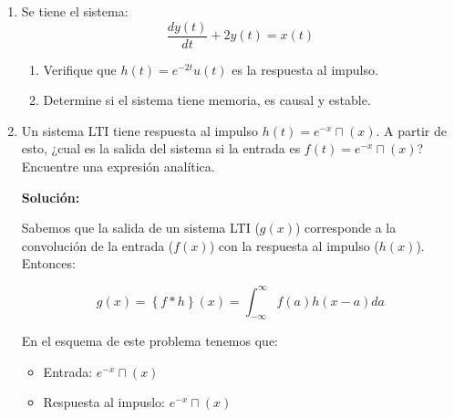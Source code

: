 \documentclass[letterpaper, 12pt]{article}
\newif\ifanswers
\begin{document}
\begin{enumerate}



    \item Se tiene el sistema:
    $$\frac{dy(t)}{dt} +2 y(t) =x(t)$$
    \begin{enumerate}
        \item Verifique que $h(t) = e^{-2t}u(t)$ es la respuesta al impulso.
        \item Determine si el sistema tiene memoria, es causal y estable.
    \end{enumerate}
    
        
        \ifanswers
        {\color{red}
        \textbf{Solución:}
        
    Primero identificamos que la entrada es $x(t)$ por lo que:
    $x(t) = \delta(t) \rightarrow y(t) = h(t)$.
    
    Es cosa de derivar $y(t)$:
    $$\frac{dy(t)}{dt} = \frac{d(e^{-2t}u(t))}{dt}$$
    Por regla del producto:
    $$\frac{dy(t)}{dt} = -2e^{-2t}u(t) + e^{-2t}\delta(t)$$
    
    Pero por propiedad del cedazo sabemos que $e^{-2t}\delta(t) = \delta(t)$ por lo que queda verificado  lo que se pide.\\
    
    Además el sistema \textbf{SI TIENE MEMORIA}, \textbf{ES CAUSAL} y \textbf{ESTABLE}, ya que su integral converge.
    
    
    }
    
    \fi


    \item Un sistema LTI tiene respuesta al impulso $h(t) = e^{-x}\sqcap(x)$. A partir de esto, ¿cual es la salida del sistema si la entrada es $f(t)=e^{-x}\sqcap(x)$? Encuentre una expresión analítica.


    \ifanswers
    {\color{red}
    \textbf{Solución:}

    Sabemos que la salida de un sistema LTI ($g(x)$) corresponde a la convolución de la entrada ($f(x)$) con la respuesta al impulso ($h(x)$). Entonces:
    
    $$
    g(x) = \left\{ f*h\right\}(x) = \int_{-\infty}^{\infty}f(a)h(x-a)da
    $$
    
    En el esquema de este problema tenemos que:
    \begin{itemize}
        \item Entrada: $e^{-x}\sqcap(x)$
        \item Respuesta al impuslo: $e^{-x}\sqcap(x)$
    \end{itemize}
    
}
\end{enumerate}
\end{document}
